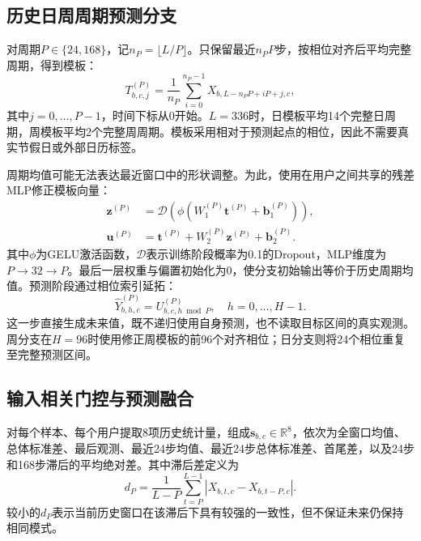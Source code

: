 \documentclass[UTF8,a4paper,zihao=5,fontset=windows]{ctexart}
\begin{document}
\subsection{历史日周周期预测分支}
对周期$P\in\{24,168\}$，记$n_P=\lfloor L/P\rfloor$。只保留最近$n_PP$步，按相位对齐后平均完整周期，得到模板：
\begin{equation}
T^{(P)}_{b,c,j}=\frac{1}{n_P}\sum_{i=0}^{n_P-1}
X_{b,L-n_PP+iP+j,c},
\label{eq:template}
\end{equation}
其中$j=0,\ldots,P-1$，时间下标从0开始。$L=336$时，日模板平均14个完整日周期，周模板平均2个完整周周期。模板采用相对于预测起点的相位，因此不需要真实节假日或外部日历标签。

周期均值可能无法表达最近窗口中的形状调整。为此，使用在用户之间共享的残差MLP修正模板向量：
\begin{equation}
\begin{aligned}
\boldsymbol z^{(P)}&=\mathcal D\!\left(\phi(W^{(P)}_1\boldsymbol t^{(P)}+\boldsymbol b^{(P)}_1)\right),\\
\boldsymbol u^{(P)}&=\boldsymbol t^{(P)}+W^{(P)}_2\boldsymbol z^{(P)}+\boldsymbol b^{(P)}_2.
\end{aligned}
\label{eq:periodmlp}
\end{equation}
其中$\phi$为GELU激活函数\cite{hendrycks2016gelu}，$\mathcal D$表示训练阶段概率为0.1的Dropout\cite{srivastava2014dropout}，MLP维度为$P\rightarrow32\rightarrow P$。最后一层权重与偏置初始化为0，使分支初始输出等价于历史周期均值。预测阶段通过相位索引延拓：
\begin{equation}
\widehat Y^{(P)}_{b,h,c}=U^{(P)}_{b,c,h\bmod P},
\quad h=0,\ldots,H-1.
\end{equation}
这一步直接生成未来值，既不递归使用自身预测，也不读取目标区间的真实观测。周分支在$H=96$时使用修正周模板的前96个对齐相位；日分支则将24个相位重复至完整预测区间。

\subsection{输入相关门控与预测融合}
对每个样本、每个用户提取8项历史统计量，组成$\boldsymbol s_{b,c}\in\mathbb{R}^8$，依次为全窗口均值、总体标准差、最后观测、最近24步均值、最近24步总体标准差、首尾差，以及24步和168步滞后的平均绝对差。其中滞后差定义为
\begin{equation}
d_P=\frac{1}{L-P}\sum_{t=P}^{L-1}|X_{b,t,c}-X_{b,t-P,c}|.
\end{equation}
较小的$d_P$表示当前历史窗口在该滞后下具有较强的一致性，但不保证未来仍保持相同模式。
\end{document}

